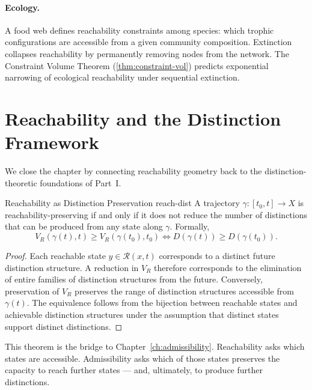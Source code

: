 \documentclass[12pt,twoside,openright]{book}
\newcommand{\reach}{\mathcal{R}}
\begin{document}
\paragraph{Ecology.} A food web defines reachability
constraints among species: which trophic configurations are
accessible from a given community composition. Extinction
collapses reachability by permanently removing nodes from
the network. The Constraint Volume Theorem
(\cref{thm:constraint-vol}) predicts exponential narrowing
of ecological reachability under sequential extinction.

\section{Reachability and the Distinction Framework}
\label{sec:ch13-connection}

We close the chapter by connecting reachability geometry
back to the distinction-theoretic foundations of Part~I.

\begin{theorem}{Reachability as Distinction Preservation}%
  {reach-dist}
  A trajectory $\gamma:[t_0,t]\to X$ is
  reachability-preserving if and only if it does not reduce
  the number of distinctions that can be produced from any
  state along $\gamma$. Formally,
  \[
    V_R(\gamma(t),t) \ge V_R(\gamma(t_0),t_0)
    \iff
    D(\gamma(t)) \ge D(\gamma(t_0)).
  \]
\end{theorem}

\begin{proof}
  Each reachable state $y\in\reach(x,t)$ corresponds to a
  distinct future distinction structure. A reduction in
  $V_R$ therefore corresponds to the elimination of entire
  families of distinction structures from the future.
  Conversely, preservation of $V_R$ preserves the range of
  distinction structures accessible from $\gamma(t)$. The
  equivalence follows from the bijection between reachable
  states and achievable distinction structures under the
  assumption that distinct states support distinct
  distinctions.
\end{proof}

This theorem is the bridge to Chapter~\ref{ch:admissibility}.
Reachability asks which states are accessible.
Admissibility asks which of those states preserves the
capacity to reach further states --- and, ultimately, to
produce further distinctions.
\end{document}
